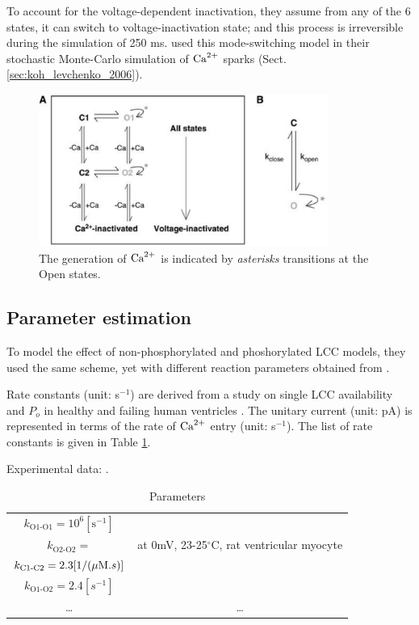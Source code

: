 To account for the voltage-dependent inactivation, they assume from any of the 6
states, it can switch to voltage-inactivation state; and this process is
irreversible during the simulation of 250 ms.  \citep{koh2006} used this
mode-switching model in their stochastic  Monte-Carlo simulation of ${\text{Ca}^{2+}}$ sparks
(Sect.\ref{sec:koh_levchenko_2006}). 

\begin{figure}[hbt]
  \centerline{\includegraphics[height=5cm,
    angle=0]{./images/LCC_Koh2003.eps}}
  \caption{The generation of ${\text{Ca}^{2+}}$ is indicated by {\it asterisks} transitions
  at the Open states. 
  }
\label{fig:LCC_Koh2003}
\end{figure}


\subsection{Parameter estimation}

To model the effect of non-phosphorylated and phoshorylated LCC models, they
used the same scheme, yet with different reaction parameters obtained from
\citep{schroder1998}.

Rate constants (unit: s$^{-1}$) are derived from a study on single LCC
availability and $P_o$ in healthy and failing human ventricles
\citep{schroder1998}. The unitary current (unit: pA) is represented in terms of
the rate of ${\text{Ca}^{2+}}$ entry (unit: s$^{-1}$). The list of rate constants is given
in Table \ref{tab:LCC_Koh2006}. 

Experimental data: \citep{wang2001,findlay2002,Johnson1996,schroder1998}.	

\begin{table}[hbt]
\begin{tabular}{cc}
$k_\text{O1-O1} = 10^6 [\text{s}^{-1}]$ & \citep{wang2001} \\
$k_\text{O2-O2} =  $ & at 0mV, 23-25$^\circ$C, rat ventricular myocyte \\
$k_\text{C1-C2} = 2.3 [1/({\mu\text{M}}.s)]$ & \\
$k_\text{O1-O2} = 2.4 [s^{-1}] $ & \\
\ldots & \ldots 
\end{tabular}
\label{tab:LCC_Koh2006}
\caption{Parameters}
\end{table}



